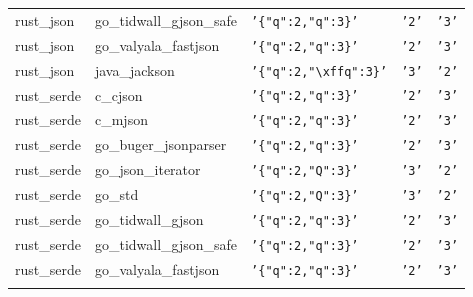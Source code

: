 \documentclass[english, 12pt, a4paper, sci, utf8, a-2b, online]{aaltothesis}
\def\str#1{\texttt{'#1'}}
\begin{document}
\begin{longtable}{lllll}
    rust\_json & go\_tidwall\_gjson\_safe & \str{\{"q":2,"q":3\}} & \str{2} & \str{3} \\
    rust\_json & go\_valyala\_fastjson & \str{\{"q":2,"q":3\}} & \str{2} & \str{3} \\
    rust\_json & java\_jackson & \str{\{"q":2,"\textbackslash xffq":3\}} & \str{3} & \str{2} \\
    rust\_serde & c\_cjson & \str{\{"q":2,"q":3\}} & \str{2} & \str{3} \\
    rust\_serde & c\_mjson & \str{\{"q":2,"q":3\}} & \str{2} & \str{3} \\
    rust\_serde & go\_buger\_jsonparser & \str{\{"q":2,"q":3\}} & \str{2} & \str{3} \\
    rust\_serde & go\_json\_iterator & \str{\{"q":2,"Q":3\}} & \str{3} & \str{2} \\
    rust\_serde & go\_std & \str{\{"q":2,"Q":3\}} & \str{3} & \str{2} \\
    rust\_serde & go\_tidwall\_gjson & \str{\{"q":2,"q":3\}} & \str{2} & \str{3} \\
    rust\_serde & go\_tidwall\_gjson\_safe & \str{\{"q":2,"q":3\}} & \str{2} & \str{3} \\
    rust\_serde & go\_valyala\_fastjson & \str{\{"q":2,"q":3\}} & \str{2} & \str{3} \\
    &&&&
\end{longtable}
\end{document}
